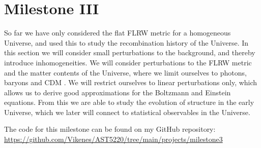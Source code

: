 \section{Milestone III}\label{M3}
So far we have only considered the flat FLRW metric for a homogeneous Universe, and used this to study the recombination history of the Universe. In this section we will consider small perturbations to the background, and thereby introduce inhomogeneities. We will consider perturbations to the FLRW metric and the matter contents of the Universe, where we limit ourselves to photons, baryons and CDM . We will restrict ourselves to linear perturbations only, which allows us to derive good approximations for the Boltzmann and Einstein equations. From this we are able to study the evolution of structure in the early Universe, which we later will connect to statistical observables in the Universe.


The code for this milestone can be found on my GitHub repository: \url{https://github.com/Vikenes/AST5220/tree/main/projects/milestone3} 





 